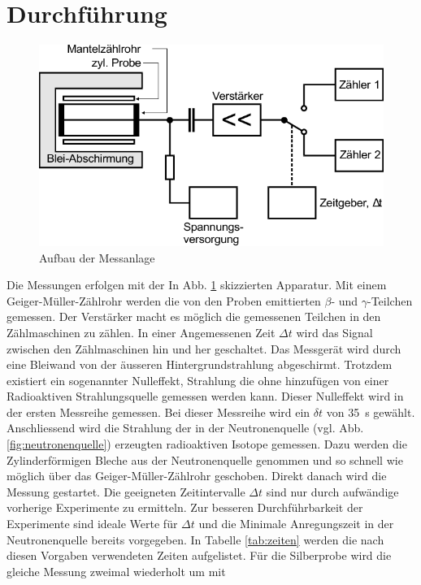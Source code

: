 \section{Durchführung}
\begin{figure}
    \centering
    \includegraphics{Abbildungen/Schaltplan.pdf}
    \caption{Aufbau der Messanlage \cite{man:v702}}
    \label{fig:Aufbau}
\end{figure}
Die Messungen erfolgen mit der In Abb. \ref{fig:Aufbau} skizzierten Apparatur.
Mit einem Geiger-Müller-Zählrohr werden die von den Proben emittierten
$\beta$- und $\gamma$-Teilchen gemessen. 
Der Verstärker macht es möglich die gemessenen Teilchen 
in den Zählmaschinen zu zählen. 
In einer Angemessenen Zeit $\Delta t$ wird das Signal zwischen den
Zählmaschinen hin und her geschaltet.
Das Messgerät wird durch eine Bleiwand von der äusseren 
Hintergrundstrahlung abgeschirmt. 
Trotzdem existiert ein sogenannter Nulleffekt, Strahlung 
die ohne hinzufügen von einer Radioaktiven Strahlungsquelle gemessen werden kann.
Dieser Nulleffekt wird in der ersten Messreihe gemessen.
Bei dieser Messreihe wird ein $\delta t$ von \qty{35}{\s} gewählt. 
Anschliessend wird die Strahlung der in der Neutronenquelle (vgl. Abb. \ref{fig:neutronenquelle})
erzeugten radioaktiven Isotope gemessen.
Dazu werden die Zylinderförmigen Bleche aus der Neutronenquelle genommen und so schnell
wie möglich über das Geiger-Müller-Zählrohr geschoben.
Direkt danach wird die Messung gestartet.
Die geeigneten Zeitintervalle $\Delta t$ sind nur durch aufwändige vorherige Experimente zu ermitteln.
Zur besseren Durchführbarkeit der Experimente sind ideale Werte für $\Delta t$
und die Minimale Anregungszeit in der Neutronenquelle bereits vorgegeben.
In Tabelle \ref{tab:zeiten} werden die nach diesen Vorgaben verwendeten Zeiten
aufgelistet.
Für die Silberprobe wird die gleiche Messung zweimal wiederholt um mit 
